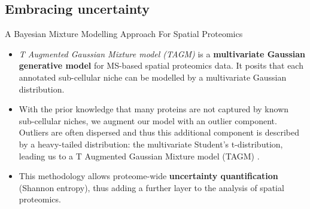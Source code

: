\subsection{Embracing uncertainty}

\begin{frame}{A Bayesian Mixture Modelling Approach For Spatial Proteomics}

  \begin{itemize}

    \item<+-> \textit{T Augmented Gaussian Mixture model (TAGM)} is a
      \textbf{multivariate Gaussian generative model} for MS-based
      spatial proteomics data. It posits that each annotated
      sub-cellular niche can be modelled by a multivariate Gaussian
      distribution.

    \item<+-> With the prior knowledge that many proteins are not
      captured by known sub-cellular niches, we augment our model with
      an outlier component. Outliers are often dispersed and thus this
      additional component is described by a heavy-tailed
      distribution: the multivariate Student's t-distribution, leading
      us to a T Augmented Gaussian Mixture model (TAGM) .

    \item<+-> This methodology allows proteome-wide
      \textbf{uncertainty quantification} (Shannon entropy), thus
      adding a further layer to the analysis of spatial proteomics.

  \end{itemize}
\end{frame}

